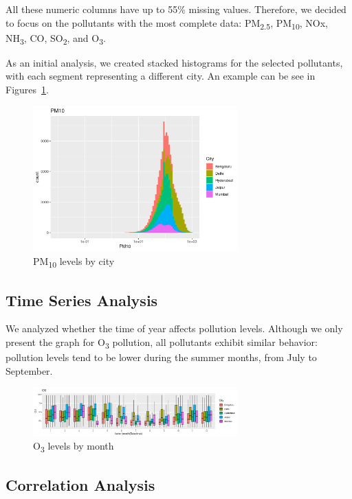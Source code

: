 \documentclass[12pt]{article}
\begin{document}
All these numeric columns have up to 55\% missing values. Therefore, we decided to focus on the pollutants with the most complete data: PM\textsubscript{2.5}, PM\textsubscript{10}, NOx, NH\textsubscript{3}, CO, SO\textsubscript{2}, and O\textsubscript{3}.

As an initial analysis, we created stacked histograms for the selected pollutants, with each segment representing a different city.
An example can be see in Figures~\ref{fig:pm10_by_city}.

\begin{figure}[H]
    \centering
    \includegraphics[width=0.7\textwidth]{pm10-by-city.png}
    \caption{PM\textsubscript{10} levels by city}
    \label{fig:pm10_by_city}
\end{figure}


\subsection{Time Series Analysis}

We analyzed whether the time of year affects pollution levels. Although we only present the graph for O\textsubscript{3} pollution, all pollutants exhibit similar behavior: pollution levels tend to be lower during the summer months, from July to September.

\begin{figure}[H]
    \centering
    \includegraphics[width=0.7\textwidth]{o3-by-month.png}
    \caption{O\textsubscript{3} levels by month}
    \label{fig:o3_by_month}
\end{figure}

\subsection{Correlation Analysis}
\end{document}
